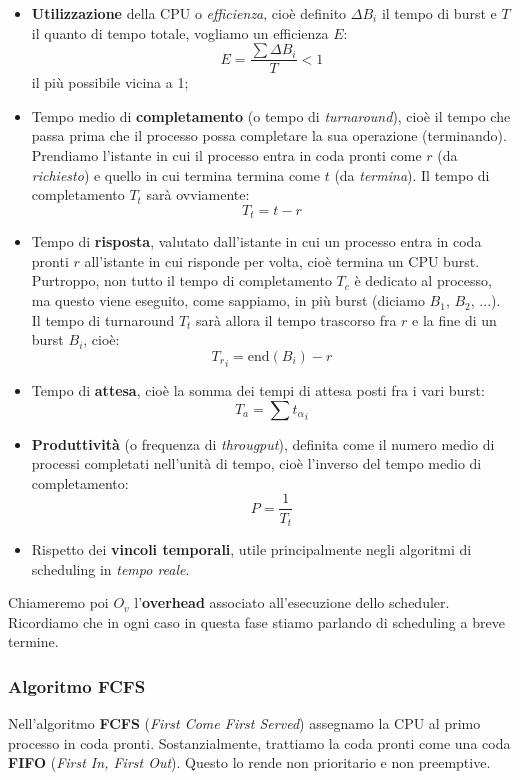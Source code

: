 \documentclass[a4paper,11pt]{article}
\begin{document}
\begin{itemize}
	\item \textbf{Utilizzazione} della CPU o \textit{efficienza}, cioè definito $\Delta B_i$ il tempo di burst e $T$ il quanto di tempo totale, vogliamo un efficienza $E$:
		$$
			E = \frac{\sum \Delta B_i}{T} < 1
		$$
		il più possibile vicina a 1;
	\item Tempo medio di \textbf{completamento} (o tempo di \textit{turnaround}), cioè il tempo che passa prima che il processo possa completare la sua operazione (terminando). Prendiamo l'istante in cui il processo entra in coda pronti come $r$ (da \textit{richiesto}) e quello in cui termina termina come $t$ (da \textit{termina}). Il tempo di completamento $T_t$ sarà ovviamente:
		$$
			T_t = t - r
		$$
	\item Tempo di \textbf{risposta}, valutato dall'istante in cui un processo entra in coda pronti $r$ all'istante in cui risponde per volta, cioè termina un CPU burst. Purtroppo, non tutto il tempo di completamento $T_c$ è dedicato al processo, ma questo viene eseguito, come sappiamo, in più burst (diciamo $B_1$, $B_2$, ...). Il tempo di turnaround $T_t$ sarà allora il tempo trascorso fra $r$ e la fine di un burst $B_i$, cioè:
		$$
			{T_r}_i = \text{end}(B_i) - r
		$$
	\item Tempo di \textbf{attesa}, cioè la somma dei tempi di attesa posti fra i vari burst:
		$$
		T_a = \sum {t_\alpha}_i
		$$
	\item \textbf{Produttività} (o frequenza di \textit{througput}), definita come il numero medio di processi completati nell'unità di tempo, cioè l'inverso del tempo medio di completamento:
		$$
			P = \frac{1}{T_t}
		$$
	\item Rispetto dei \textbf{vincoli temporali}, utile principalmente negli algoritmi di scheduling in \textit{tempo reale}.
\end{itemize}

Chiameremo poi $O_v$ l'\textbf{overhead} associato all'esecuzione dello scheduler. Ricordiamo che in ogni caso in questa fase stiamo parlando di scheduling a breve termine.

\subsubsection{Algoritmo FCFS}
Nell'algoritmo \textbf{FCFS} (\textit{First Come First Served}) assegnamo la CPU al primo processo in coda pronti. Sostanzialmente, trattiamo la coda pronti come una coda \textbf{FIFO} (\textit{First In, First Out}).
Questo lo rende non prioritario e non preemptive.
\end{document}
